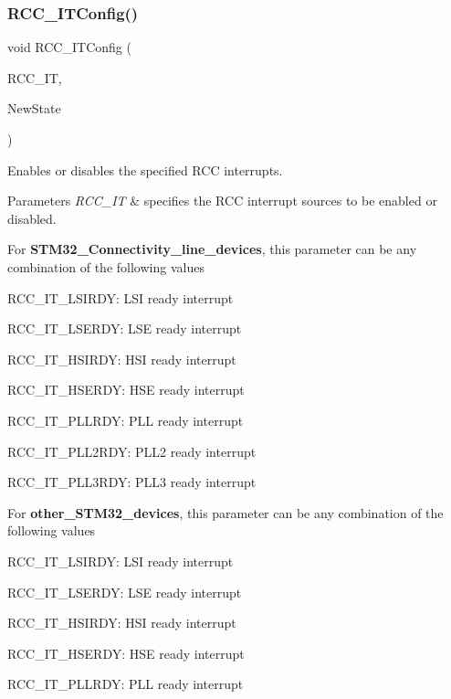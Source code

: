 \subsubsection{\texorpdfstring{R\+C\+C\+\_\+\+I\+T\+Config()}{RCC\_ITConfig()}}
{\footnotesize\ttfamily void R\+C\+C\+\_\+\+I\+T\+Config (\begin{DoxyParamCaption}\item[{uint8\+\_\+t}]{R\+C\+C\+\_\+\+IT,  }\item[{\hyperlink{group___exported__types_gac9a7e9a35d2513ec15c3b537aaa4fba1}{Functional\+State}}]{New\+State }\end{DoxyParamCaption})}



Enables or disables the specified R\+CC interrupts. 


\begin{DoxyParams}{Parameters}
{\em R\+C\+C\+\_\+\+IT} & specifies the R\+CC interrupt sources to be enabled or disabled.\\
\hline
\end{DoxyParams}
For {\bfseries S\+T\+M32\+\_\+\+Connectivity\+\_\+line\+\_\+devices}, this parameter can be any combination of the following values \begin{DoxyItemize}
\item R\+C\+C\+\_\+\+I\+T\+\_\+\+L\+S\+I\+R\+DY\+: L\+SI ready interrupt \item R\+C\+C\+\_\+\+I\+T\+\_\+\+L\+S\+E\+R\+DY\+: L\+SE ready interrupt \item R\+C\+C\+\_\+\+I\+T\+\_\+\+H\+S\+I\+R\+DY\+: H\+SI ready interrupt \item R\+C\+C\+\_\+\+I\+T\+\_\+\+H\+S\+E\+R\+DY\+: H\+SE ready interrupt \item R\+C\+C\+\_\+\+I\+T\+\_\+\+P\+L\+L\+R\+DY\+: P\+LL ready interrupt \item R\+C\+C\+\_\+\+I\+T\+\_\+\+P\+L\+L2\+R\+DY\+: P\+L\+L2 ready interrupt \item R\+C\+C\+\_\+\+I\+T\+\_\+\+P\+L\+L3\+R\+DY\+: P\+L\+L3 ready interrupt\end{DoxyItemize}
For {\bfseries other\+\_\+\+S\+T\+M32\+\_\+devices}, this parameter can be any combination of the following values \begin{DoxyItemize}
\item R\+C\+C\+\_\+\+I\+T\+\_\+\+L\+S\+I\+R\+DY\+: L\+SI ready interrupt \item R\+C\+C\+\_\+\+I\+T\+\_\+\+L\+S\+E\+R\+DY\+: L\+SE ready interrupt \item R\+C\+C\+\_\+\+I\+T\+\_\+\+H\+S\+I\+R\+DY\+: H\+SI ready interrupt \item R\+C\+C\+\_\+\+I\+T\+\_\+\+H\+S\+E\+R\+DY\+: H\+SE ready interrupt \item R\+C\+C\+\_\+\+I\+T\+\_\+\+P\+L\+L\+R\+DY\+: P\+LL ready interrupt\end{DoxyItemize}

